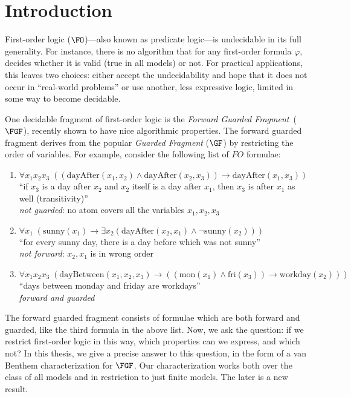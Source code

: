 \chapter{Introduction}\label{chap:introduction}

First-order logic ($\FO$)---also known as predicate logic---is undecidable in its full generality\cite[Sec. 1.1]{borger1997}.
For instance, there is no algorithm that for any first-order formula $\varphi$, decides whether it is valid (true in all models) or not.
For practical applications, this leaves two choices: either accept the undecidability and hope that it does not occur in ``real-world problems'' or use another, less expressive logic, limited in some way to become decidable.

One decidable fragment of first-order logic is the \emph{Forward Guarded Fragment}~($\FGF$), recently shown to have nice algorithmic properties\cite{Bednarczyk21}.
The forward guarded fragment derives from the popular \emph{Guarded Fragment} ($\GF$) by restricting the order of variables.
For example, consider the following list of $FO$ formulae:
\begin{enumerate}
  \item $\forall{x_{1}x_{2}x_{3}}\; ((\mathrm{dayAfter}(x_{1},x_{2}) \land \mathrm{dayAfter}(x_{2},x_{3})) \to \mathrm{dayAfter}(x_{1}, x_{3}))$ \\
        ``if $x_{3}$ is a day after $x_{2}$ and $x_{2}$ itself is a day after $x_{1}$, then $x_{3}$ is after $x_{1}$ as well (transitivity)'' \\
        \emph{not guarded}: no atom covers all the variables $x_{1}, x_{2}, x_{3}$
  \item $\forall{x_{1}}\; (\mathrm{sunny}(x_{1}) \to \exists{x_{2}} (\mathrm{dayAfter}(x_{2},x_{1}) \land \neg \mathrm{sunny}(x_{2})))$ \\
        ``for every sunny day, there is a day before which was not sunny'' \\
        \emph{not forward}: $x_{2}, x_{1}$ is in wrong order
  \item $\forall{x_{1}x_{2}x_{3}}\; (\mathrm{dayBetween}(x_{1},x_{2},x_{3}) \to ((\mathrm{mon}(x_{1}) \land \mathrm{fri}(x_{3})) \to \mathrm{workday}(x_{2})))$ \\
        ``days between monday and friday are workdays'' \\
        \emph{forward and guarded}
\end{enumerate}
The forward guarded fragment consists of formulae which are both forward and guarded, like the third formula in the above list.
Now, we ask the question: if we restrict first-order logic in this way, which properties can we express, and which not?
In this thesis, we give a precise answer to this question, in the form of a van Benthem characterization for $\FGF$.
Our characterization works both over the class of all models and in restriction to just finite models.
The later is a new result.

